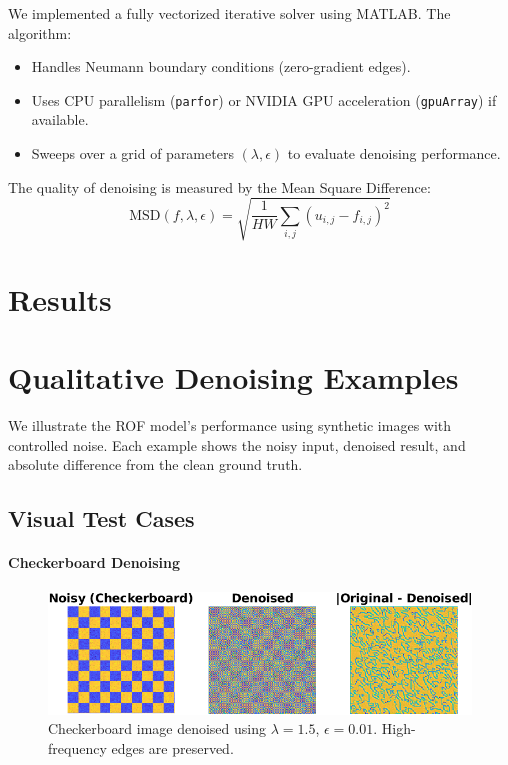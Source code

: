 \documentclass[11pt]{article}
\begin{document}
We implemented a fully vectorized iterative solver using MATLAB. The algorithm:
\begin{itemize}
  \item Handles Neumann boundary conditions (zero-gradient edges).
  \item Uses CPU parallelism (\texttt{parfor}) or NVIDIA GPU acceleration (\texttt{gpuArray}) if available.
  \item Sweeps over a grid of parameters \((\lambda, \epsilon)\) to evaluate denoising performance.
\end{itemize}

The quality of denoising is measured by the Mean Square Difference:
\[
\text{MSD}(f, \lambda, \epsilon) = \sqrt{\frac{1}{HW} \sum_{i,j} (u_{i,j} - f_{i,j})^2}
\]

\section*{Results}


\section*{Qualitative Denoising Examples}

We illustrate the ROF model's performance using synthetic images with controlled noise. Each example shows the noisy input, denoised result, and absolute difference from the clean ground truth.

\subsection*{Visual Test Cases}

\paragraph{Checkerboard Denoising}
\begin{figure}[h!]
\centering
\includegraphics[width=\textwidth]{../utils/results/test_images/checkerboard_denoising.png}
\caption{Checkerboard image denoised using \(\lambda=1.5\), \(\epsilon=0.01\). High-frequency edges are preserved.}
\end{figure}
\end{document}
